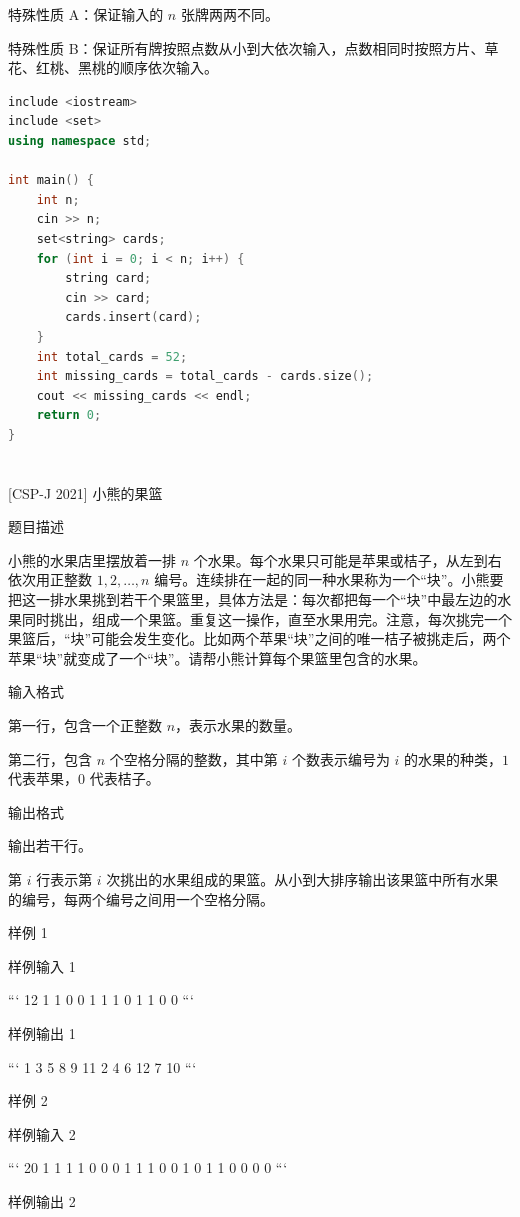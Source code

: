 \documentclass[12pt,twiside,a4paper]{ctexbook}
\numberwithin{chapter}{part}
\begin{document}
特殊性质 A：保证输入的 $n$ 张牌两两不同。

特殊性质 B：保证所有牌按照点数从小到大依次输入，点数相同时按照方片、草花、红桃、黑桃的顺序依次输入。
\begin{lstlisting}[language=c++,breaklines=true]
include <iostream>
include <set>
using namespace std;

int main() {
    int n;
    cin >> n;
    set<string> cards;
    for (int i = 0; i < n; i++) {
        string card;
        cin >> card;
        cards.insert(card);
    }
    int total_cards = 52;
    int missing_cards = total_cards - cards.size();
    cout << missing_cards << endl;
    return 0;
}
\end{lstlisting}

\section{}
 [CSP-J 2021] 小熊的果篮

 题目描述

小熊的水果店里摆放着一排 $n$ 个水果。每个水果只可能是苹果或桔子，从左到右依次用正整数 $1, 2, \ldots, n$ 编号。连续排在一起的同一种水果称为一个“块”。小熊要把这一排水果挑到若干个果篮里，具体方法是：每次都把每一个“块”中最左边的水果同时挑出，组成一个果篮。重复这一操作，直至水果用完。注意，每次挑完一个果篮后，“块”可能会发生变化。比如两个苹果“块”之间的唯一桔子被挑走后，两个苹果“块”就变成了一个“块”。请帮小熊计算每个果篮里包含的水果。

 输入格式

第一行，包含一个正整数 $n$，表示水果的数量。

第二行，包含 $n$ 个空格分隔的整数，其中第 $i$ 个数表示编号为 $i$ 的水果的种类，$1$ 代表苹果，$0$ 代表桔子。

 输出格式

输出若干行。

第 $i$ 行表示第 $i$ 次挑出的水果组成的果篮。从小到大排序输出该果篮中所有水果的编号，每两个编号之间用一个空格分隔。

 样例 1

 样例输入 1

```
12
1 1 0 0 1 1 1 0 1 1 0 0
```

 样例输出 1

```
1 3 5 8 9 11
2 4 6 12
7
10
```

 样例 2

 样例输入 2

```
20
1 1 1 1 0 0 0 1 1 1 0 0 1 0 1 1 0 0 0 0
```

 样例输出 2
\end{document}
